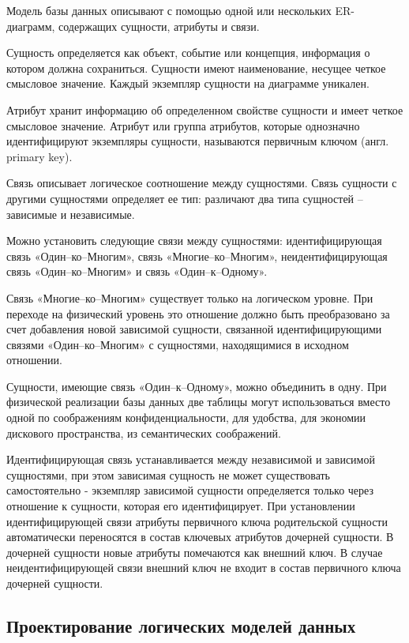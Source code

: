 Модель базы данных описывают с помощью одной или нескольких ER- диаграмм, содержащих сущности, атрибуты и связи.

Сущность определяется как объект, событие или концепция, информация о котором должна сохраниться. Сущности имеют наименование, несущее четкое смысловое значение. Каждый экземпляр сущности на диаграмме уникален.

Атрибут хранит информацию об определенном свойстве сущности и имеет четкое смысловое значение. Атрибут или группа атрибутов, которые однозначно идентифицируют экземпляры сущности, называются первичным ключом (англ. primary key).

Связь описывает логическое соотношение между сущностями. Связь сущности с другими сущностями определяет ее тип: различают два типа сущностей – зависимые и независимые.

Можно установить следующие связи между сущностями: идентифицирующая связь «Один–ко–Многим», связь «Многие–ко–Многим», неидентифицирующая связь «Один–ко–Многим» и связь «Один–к–Одному».

Связь «Многие–ко–Многим» существует только на логическом уровне. При переходе на физический уровень это отношение должно быть преобразовано за счет добавления новой зависимой сущности, связанной идентифицирующими связями «Один–ко–Многим» с сущностями, находящимися в исходном отношении.

Сущности, имеющие связь «Один–к–Одному», можно объединить в одну. При физической реализации базы данных две таблицы могут использоваться вместо одной по соображениям конфиденциальности, для удобства, для экономии дискового пространства, из семантических соображений.

Идентифицирующая связь устанавливается между независимой и зависимой сущностями, при этом зависимая сущность не может существовать самостоятельно - экземпляр зависимой сущности определяется только через отношение к сущности, которая его идентифицирует. При установлении идентифицирующей связи атрибуты первичного ключа родительской сущности автоматически переносятся в состав ключевых атрибутов дочерней сущности.  В дочерней сущности новые атрибуты помечаются как внешний ключ. В случае неидентифицирующей связи внешний ключ не входит в состав первичного ключа дочерней сущности.



\subsection{Проектирование логических моделей данных}

